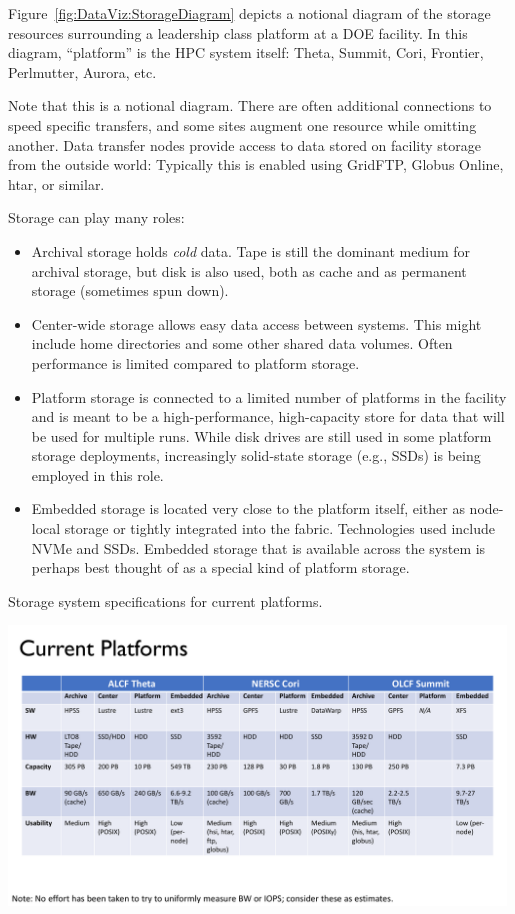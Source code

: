 Figure~\ref{fig:DataViz:StorageDiagram} depicts a notional diagram of
the storage resources surrounding a leadership class platform at a DOE
facility. In this diagram, ``platform'' is the HPC system itself: Theta, Summit,
Cori, Frontier, Perlmutter, Aurora, etc. 

Note that this is a notional diagram. There are often additional
connections to speed specific transfers, and some sites augment one resource
while omitting another.
%
Data transfer nodes provide access to data stored on facility storage from the
outside world: Typically this is enabled using GridFTP, Globus Online, htar, or
similar.

Storage can play many roles:
\begin{itemize}
	\item Archival storage holds \textit{cold} data. Tape is
	still the dominant medium for archival storage, but disk is also used,
	both as cache and as permanent storage (sometimes spun down).
	\item Center-wide storage allows easy data access between
	systems. This might include home directories and some other shared data
	volumes. Often performance is limited compared to platform storage.
	\item Platform storage is connected to a limited
	number of platforms in the facility and is meant to be a high-performance,
	high-capacity store for data that will be used for multiple runs. While
	disk drives are still used in some platform storage deployments,
	increasingly solid-state storage (e.g., SSDs) is being employed in
	this role.
	\item Embedded storage is located very close to the platform
	itself, either as node-local storage or tightly integrated into the
	fabric. Technologies used include NVMe and SSDs. Embedded storage that
	is available across the system is perhaps best thought of as a special 
	kind of platform storage.
\end{itemize}

%
%
\begin{table}[htb!]
	\vspace{-2mm}
	\centering
	\caption{\label{table:DataViz:StorageSpecsCurrent} Storage system specifications for current platforms.}
	\includegraphics[width=0.99\textwidth]{projects/2.3.4-DataViz/DataViz-storage-specs-current.pdf}
\end{table}

